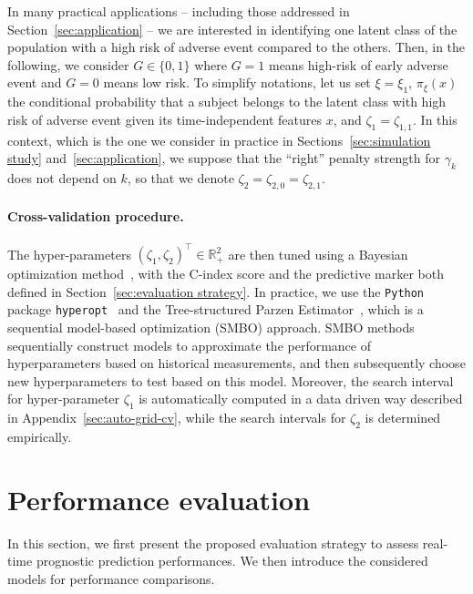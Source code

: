 \documentclass[11pt]{article}
\newcommand{\R}{\mathds R}
\begin{document}
In many practical applications -- including those addressed in Section~\ref{sec:application} -- we are interested in identifying one latent class of the population with a high risk of adverse event compared to the others. Then, in the following, we consider $G \in \{ 0, 1\}$ where $G=1$ means high-risk of early adverse event and $G=0$ means low risk.
To simplify notations, let us set $\xi = \xi_1$, $\pi_\xi(x)$ the conditional probability that a subject belongs to the latent class with high risk of adverse event given its time-independent features $x$, and $\zeta_1 = \zeta_{1,1}$.
In this context, which is the one we consider in practice in Sections~\ref{sec:simulation study} and~\ref{sec:application}, we suppose that the ``right'' penalty strength for $\gamma_k$ does not depend on $k$, so that we denote $\zeta_2 = \zeta_{2,0} = \zeta_{2,1}$. 

\paragraph{Cross-validation procedure.}

The hyper-parameters $(\zeta_1, \zeta_2)^\top \in \R_+^2$ are then tuned using a Bayesian optimization method~\citep{snoek2012practical}, with the C-index score and the predictive marker both defined in Section~\ref{sec:evaluation strategy}. In practice, we use the \texttt{Python} package \texttt{hyperopt}~\citep{bergstra2013hyperopt} and the Tree-structured Parzen Estimator~\citep{bergstra2011algorithms}, which is a sequential model-based optimization (SMBO) approach. SMBO methods sequentially construct models to approximate the performance of hyperparameters based on historical measurements, and then subsequently choose new hyperparameters to test based on this model.
Moreover, the search interval for hyper-parameter $\zeta_1$ is automatically computed in a data driven way described in Appendix~\ref{sec:auto-grid-cv}, while the search intervals for $\zeta_2$ is determined empirically.


\section{Performance evaluation}
\label{sec:Performance evaluation}

In this section, we first present the proposed evaluation strategy to assess real-time prognostic prediction performances. We then introduce the considered models for performance comparisons.
\end{document}
